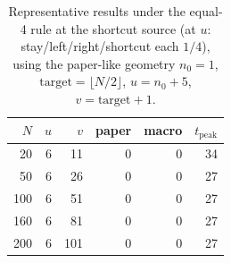 \begin{table}[!htbp]
\centering
\small
\begin{tabular}{rrrrrr}
\toprule
$N$ & $u$ & $v$ & paper & macro & $t_\mathrm{peak}$\\
\midrule
20 & 6 & 11 & 0 & 0 & 34\\
50 & 6 & 26 & 0 & 0 & 27\\
100 & 6 & 51 & 0 & 0 & 27\\
160 & 6 & 81 & 0 & 0 & 27\\
200 & 6 & 101 & 0 & 0 & 27\\
\bottomrule
\end{tabular}
\caption{Representative results under the equal-4 rule at the shortcut source (at $u$: stay/left/right/shortcut each $1/4$), using the paper-like geometry $n_0=1$, $\mathrm{target}=\lfloor N/2\rfloor$, $u=n_0+5$, $v=\mathrm{target}+1$.}
\label{tab:equal4-paper-geom-en}
\end{table}
